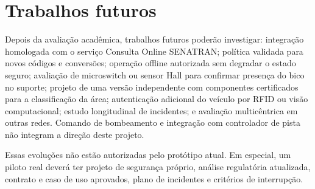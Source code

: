 \section{Trabalhos futuros}
\label{sec:futuros}

Depois da avaliação acadêmica, trabalhos futuros poderão investigar: integração
homologada com o serviço Consulta Online SENATRAN; política validada para novos códigos e
conversões; operação offline autorizada sem degradar o estado seguro; avaliação
de microswitch ou sensor Hall para confirmar presença do bico no suporte;
projeto de uma versão independente com componentes certificados para a
classificação da área; autenticação adicional do veículo por RFID ou visão
computacional; estudo longitudinal de incidentes; e avaliação multicêntrica em
outras redes. Comando de bombeamento e integração com controlador de pista não
integram a direção deste projeto.

Essas evoluções não estão autorizadas pelo protótipo atual. Em especial, um
piloto real deverá ter projeto de segurança próprio, análise regulatória
atualizada, contrato e caso de uso aprovados, plano de incidentes e critérios de
interrupção.
